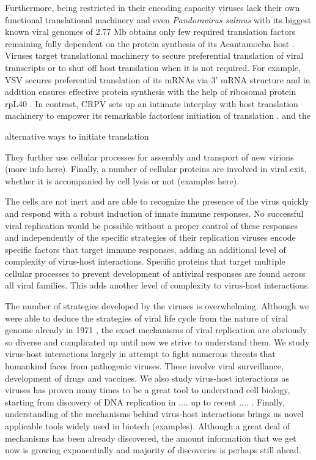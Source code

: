 	Furthermore, being restricted in their encoding capacity viruses lack their own functional translational machinery and even \textit{Pandoravirus salinus} with its biggest known viral genomes of 2.77 \gls{Mb} obtains only few required translation factors remaining fully dependent on the protein synthesis of its Acantamoeba host \parencite{Philippe2013}. Viruses target translational machinery to secure preferential translation of viral transcripts or to shut off host translation when it is not required. For example, \gls{VSV} secures preferential translation of its mRNAs via 3' mRNA structure \parencite{Whitlow2006} and in addition ensures effective protein synthesis with the help of ribosomal protein rpL40 \parencite{Lee2013}. In contrast, \gls{CRPV} sets up an intimate interplay with host translation machinery to empower its remarkable factorless initiation of translation \parencite{Bushell2002}. and the  
	
	alternative ways to initiate translation 
	 
	
	They further use cellular processes for assembly and transport of new virions (more info here). Finally, a number of cellular proteins are involved in viral exit, whether it is accompanied by cell lysis or not (examples here).
	
	The cells are not inert and are able to recognize the presence of the virus quickly and respond with a robust induction of innate immune responses. No successful viral replication would be possible without a proper control of these responses and independently of the specific strategies of their replication viruses encode specific factors that target immune responses, adding an additional level of complexity of virus-host interactions. Specific proteins that target multiple cellular processes to prevent development of antiviral responses are found across all viral families. This adds another level of complexity to virus-host interactions. 

	The number of strategies developed by the viruses is overwhelming. Although we were able to deduce the strategies of viral life cycle from the nature of viral genome already in 1971 \parencite{Baltimore1971}, the exact mechanisms of viral replication are obviously so diverse and complicated up until now we strive to understand them. We study virus-host interactions largely in attempt to fight numerous threats that humankind faces from pathogenic viruses. These involve viral surveillance, development of drugs and vaccines. We also study virus-host interactions as viruses has proven many times to be a great tool to understand cell biology, starting from discovery of DNA replication in .... up to recent .... . Finally, understanding of the mechanisms behind virus-host interactions brings us novel applicable tools widely used in biotech (examples). Although a great deal of mechanisms has been already discovered, the amount information that we get now is growing exponentially and majority of discoveries is perhaps still ahead. 
		
